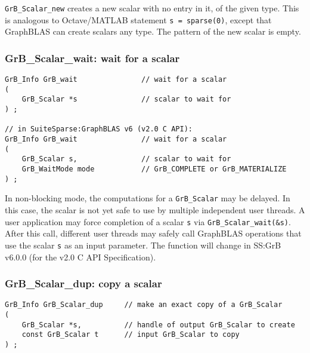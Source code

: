 \documentclass[12pt]{article}
\begin{document}
\verb'GrB_Scalar_new' creates a new scalar with no
entry in it, of the given type.  This is analogous to Octave/MATLAB statement
\verb's = sparse(0)', except that GraphBLAS can create scalars any
type.  The pattern of the new scalar is empty.

\subsubsection{{\sf GrB\_Scalar\_wait:} wait for a scalar}
\label{scalar_wait}

\begin{mdframed}[userdefinedwidth=6in]
{\footnotesize
\begin{verbatim}
GrB_Info GrB_wait               // wait for a scalar
(
    GrB_Scalar *s               // scalar to wait for
) ;

// in SuiteSparse:GraphBLAS v6 (v2.0 C API):
GrB_Info GrB_wait               // wait for a scalar
(
    GrB_Scalar s,               // scalar to wait for
    GrB_WaitMode mode           // GrB_COMPLETE or GrB_MATERIALIZE
) ;
\end{verbatim}
}\end{mdframed}

In non-blocking mode, the computations for a \verb'GrB_Scalar' may be delayed.
In this case, the scalar is not yet safe to use by multiple independent user
threads.  A user application may force completion of a scalar \verb's' via
\verb'GrB_Scalar_wait(&s)'.  After this call, different user threads may safely
call GraphBLAS operations that use the scalar \verb's' as an input parameter.
The function will change in SS:GrB v6.0.0 (for the v2.0 C API Specification).

\subsubsection{{\sf GrB\_Scalar\_dup:} copy a scalar}
\label{scalar_dup}

\begin{mdframed}[userdefinedwidth=6in]
{\footnotesize
\begin{verbatim}
GrB_Info GrB_Scalar_dup     // make an exact copy of a GrB_Scalar
(
    GrB_Scalar *s,          // handle of output GrB_Scalar to create
    const GrB_Scalar t      // input GrB_Scalar to copy
) ;
\end{verbatim}
} \end{mdframed}
\end{document}
